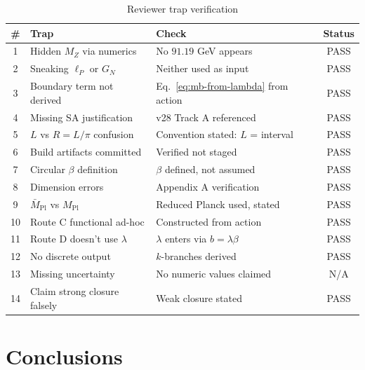 \documentclass[11pt,a4paper]{article}
\begin{document}
\begin{table}[h]
\centering
\caption{Reviewer trap verification}
\label{tab:traps}
\begin{tabular}{clp{5cm}c}
\toprule
\# & Trap & Check & Status \\
\midrule
1 & Hidden $M_Z$ via numerics & No $91.19$ GeV appears & PASS \\
2 & Sneaking $\ell_P$ or $G_N$ & Neither used as input & PASS \\
3 & Boundary term not derived & Eq.~\eqref{eq:mb-from-lambda} from action & PASS \\
4 & Missing SA justification & v28 Track A referenced & PASS \\
5 & $L$ vs $R = L/\pi$ confusion & Convention stated: $L$ = interval & PASS \\
6 & Build artifacts committed & Verified not staged & PASS \\
7 & Circular $\beta$ definition & $\beta$ defined, not assumed & PASS \\
8 & Dimension errors & Appendix A verification & PASS \\
9 & $\bar{M}_{\text{Pl}}$ vs $M_{\text{Pl}}$ & Reduced Planck used, stated & PASS \\
10 & Route C functional ad-hoc & Constructed from action & PASS \\
11 & Route D doesn't use $\lambda$ & $\lambda$ enters via $b = \lambda\beta$ & PASS \\
12 & No discrete output & $k$-branches derived & PASS \\
13 & Missing uncertainty & No numeric values claimed & N/A \\
14 & Claim strong closure falsely & Weak closure stated & PASS \\
\bottomrule
\end{tabular}
\end{table}

\section{Conclusions}
\label{sec:conclusions}
\end{document}

